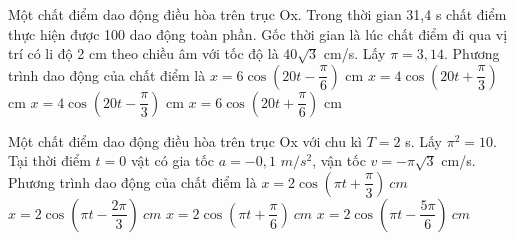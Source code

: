 \begin{vidu}%
Một chất điểm dao động điều hòa trên trục Ox. Trong thời gian 31,4 s chất điểm thực hiện được 100 dao động toàn phần. Gốc thời gian là lúc chất điểm đi qua vị trí có li độ 2 cm theo chiều âm với tốc độ là $40\sqrt{3}$ cm/s. Lấy $\pi = 3,14$. Phương trình dao động của chất điểm là
\choice 
{$x = 6\cos\left(20t - \dfrac{\pi}{6}\right)$ cm}
{\True $x = 4\cos\left(20t + \dfrac{\pi}{3}\right)$ cm}
{$x = 4\cos\left(20t - \dfrac{\pi}{3}\right)$ cm}
{$x = 6\cos\left(20t + \dfrac{\pi}{6}\right)$ cm}
\end{vidu} 
\begin{vidu}%
Một chất điểm dao động điều hòa trên trục Ox với chu kì $T = 2$ s. Lấy $\pi^2=10$. Tại thời điểm $t = 0$ vật có gia tốc $a = - 0,1$ $m/s^2$, vận tốc $v=-\pi \sqrt{3}$ cm/s. Phương trình dao động của chất điểm là
\choice
{\True $x=2 \cos\left(\pi t+\dfrac{\pi}{3}\right)\ cm$}
{$x=2\cos \left(\pi t-\dfrac{2\pi}{3}\right)\ cm$}
{$x=2 \cos\left(\pi t+\dfrac{\pi}{6}\right)\ cm$}
{$x=2 \cos\left(\pi t-\dfrac{5\pi}{6}\right)\ cm$}
\end{vidu} 

